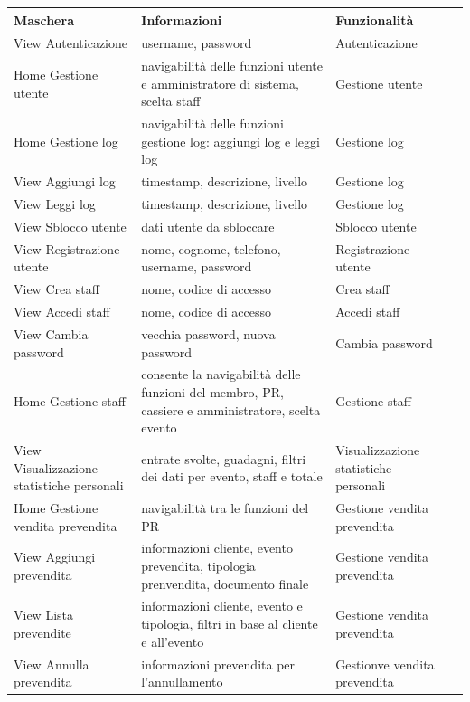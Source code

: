\documentclass[a4paper]{article}
\begin{document}
\begin{center}
    \begin{tabularx}{1\textwidth}{|X|X|X|X|}
    \hline
    \textbf{Maschera} & \textbf{Informazioni} & \textbf{Funzionalità}\\
    \hline
    \hline
    View Autenticazione & username, password & Autenticazione\\
    \hline
    Home Gestione utente & navigabilità delle funzioni utente e amministratore di sistema, scelta staff & Gestione utente\\
    \hline
    Home Gestione log & navigabilità delle funzioni gestione log: aggiungi log e leggi log & Gestione log\\
    \hline
    View Aggiungi log & timestamp, descrizione, livello & Gestione log\\
    \hline
    View Leggi log & timestamp, descrizione, livello & Gestione log\\
    \hline
    View Sblocco utente & dati utente da sbloccare & Sblocco utente \\
    \hline
    View Registrazione utente & nome, cognome, telefono, username, password & Registrazione utente\\
    \hline
    View Crea staff & nome, codice di accesso & Crea staff\\
    \hline
    View Accedi staff & nome, codice di accesso & Accedi staff\\
    \hline
    View Cambia password & vecchia password, nuova password & Cambia password\\
    \hline
    Home Gestione staff & consente la navigabilità delle funzioni del membro, PR, cassiere e amministratore, scelta evento & Gestione staff\\
    \hline
    View Visualizzazione statistiche personali & entrate svolte, guadagni, filtri dei dati per evento, staff e totale & Visualizzazione statistiche personali\\
    \hline
    Home Gestione vendita prevendita & navigabilità tra le funzioni del PR & Gestione vendita prevendita\\
    \hline
    View Aggiungi prevendita & informazioni cliente, evento prevendita, tipologia prenvendita, documento finale & Gestione vendita prevendita\\
    \hline
    View Lista prevendite & informazioni cliente, evento e tipologia, filtri in base al cliente e all'evento & Gestione vendita prevendita\\
    \hline
    View Annulla prevendita & informazioni prevendita per l'annullamento & Gestionve vendita prevendita\\

\end{tabularx}
\end{center}
\end{document}
